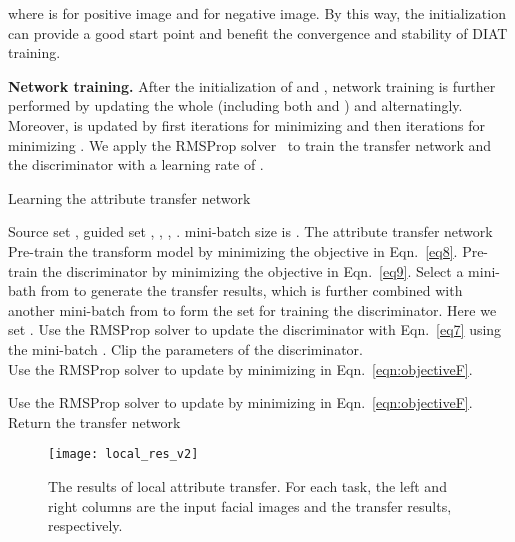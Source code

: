 \documentclass[journal]{IEEEtran}
\begin{document}
where  is  for positive image  and  for negative image.
By this way, the initialization can provide a good start point and benefit the convergence and stability of DIAT training.



\textbf{Network training.}\quad
After the initialization of  and , network training is further performed by updating the whole  (including both  and ) and  alternatingly.
Moreover,  is updated by first  iterations for minimizing  and then  iterations for minimizing .
We apply the RMSProp solver~\cite{hinton2012rmsprop} to train the transfer network  and the discriminator  with a learning rate of .

\begin{algorithm}[!tbp]
\caption{Learning the attribute transfer network}\label{alg1}
\begin{algorithmic}[1]
\renewcommand{\algorithmicrequire}{\textbf{Input:}}
\renewcommand{\algorithmicensure}{\textbf{End}}
\REQUIRE Source set , guided set , , , . mini-batch size is .
\renewcommand{\algorithmicrequire}{\textbf{Output:}}
\renewcommand{\algorithmicensure}{\textbf{End}}
\REQUIRE The attribute transfer network 
\STATE
Pre-train the transform model  by minimizing the objective in Eqn.~\eqref{eq8}.
\STATE
Pre-train the discriminator  by minimizing the objective in Eqn.~\eqref{eq9}.
\STATE
Select a mini-bath  from  to generate the transfer results, which is further combined with another mini-batch  from  to form the set  for training the discriminator. Here we set .
\FOR{}
\STATE
Use the RMSProp solver to update the discriminator  with Eqn.~\eqref{eq7} using the mini-batch .
\ENDFOR
\STATE
Clip the parameters of the discriminator. \\
\FOR{}
\STATE
Use the RMSProp solver to update  by minimizing  in Eqn.~\eqref{eqn:objectiveF}.
\ENDFOR

\FOR{}
\STATE
Use the RMSProp solver to update  by minimizing  in Eqn.~\eqref{eqn:objectiveF}.
\ENDFOR
\ENDWHILE
\STATE
Return the transfer network 
\end{algorithmic}
\end{algorithm}



\begin{figure*}
\begin{center}
\texttt{[image: local\_res\_v2]}
\end{center}
   \caption{The results of local attribute transfer. For each task, the left and right columns are the input facial images and the transfer results, respectively.}
\label{local_results}
\end{figure*}
\end{document}
